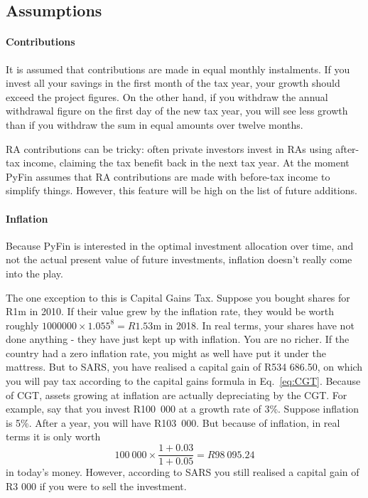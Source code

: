 \documentclass[a4paper, justified]{tufte-handout}
\begin{document}
\subsection{Assumptions}

\paragraph{Contributions} It is assumed that contributions are made in equal monthly instalments. If you invest all your savings in the first month of the tax year, your growth should exceed the project figures. On the other hand, if you withdraw the annual withdrawal figure on the first day of the new tax year, you will see less growth than if you withdraw the sum in equal amounts over twelve months.

RA contributions can be tricky: often private investors invest in RAs using after-tax income, claiming the tax benefit back in the next tax year. At the moment PyFin assumes that RA contributions are made with before-tax income to simplify things. However, this feature will be high on the list of future additions.

\paragraph{Inflation} Because PyFin is interested in the optimal investment allocation over time, and not the actual present value of future investments, inflation doesn't really come into the play.

The one exception to this is Capital Gains Tax. Suppose you bought shares for R1m in 2010. If their value grew by the inflation rate, they would be worth roughly $1000000\times1.055^8 = R1.53$m in 2018. In real terms, your shares have not done anything - they have just kept up with inflation. You are no richer. If the country had a zero inflation rate, you might as well have put it under the mattress. But to SARS, you have realised a capital gain of R534 686.50, on which you will pay tax according to the capital gains formula in Eq.~\ref{eq:CGT}. Because of CGT, assets growing at inflation are actually depreciating by the CGT. For example, say that you invest R100~000 at a growth rate of 3\%. Suppose inflation is 5\%. After a year, you will have R103~000. But because of inflation, in real terms it is only worth 
\begin{equation}
100~000 \times \frac{1+0.03}{1+0.05} = R98~095.24
\end{equation}
in today's money. However, according to SARS you still realised a capital gain of R3 000 if you were to sell the investment.
\end{document}
